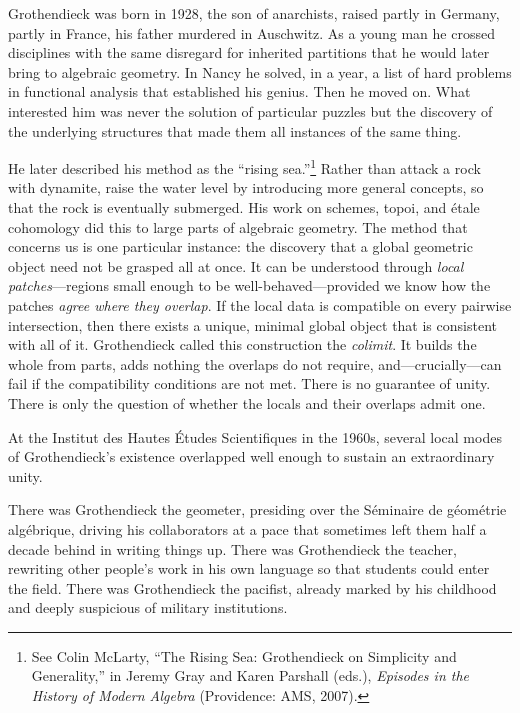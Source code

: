Grothendieck was born in 1928, the son of anarchists, raised partly in Germany, partly in France, his father murdered in Auschwitz. As a young man he crossed disciplines with the same disregard for inherited partitions that he would later bring to algebraic geometry. In Nancy he solved, in a year, a list of hard problems in functional analysis that established his genius. Then he moved on. What interested him was never the solution of particular puzzles but the discovery of the underlying structures that made them all instances of the same thing.

He later described his method as the ``rising sea.''\footnote{See Colin McLarty, ``The Rising Sea: Grothendieck on Simplicity and Generality,'' in Jeremy Gray and Karen Parshall (eds.), \emph{Episodes in the History of Modern Algebra} (Providence: AMS, 2007).} Rather than attack a rock with dynamite, raise the water level by introducing more general concepts, so that the rock is eventually submerged. His work on schemes, topoi, and \'{e}tale cohomology did this to large parts of algebraic geometry. The method that concerns us is one particular instance: the discovery that a global geometric object need not be grasped all at once. It can be understood through \emph{local patches}---regions small enough to be well-behaved---provided we know how the patches \emph{agree where they overlap}. If the local data is compatible on every pairwise intersection, then there exists a unique, minimal global object that is consistent with all of it. Grothendieck called this construction the \emph{colimit}. It builds the whole from parts, adds nothing the overlaps do not require, and---crucially---can fail if the compatibility conditions are not met. There is no guarantee of unity. There is only the question of whether the locals and their overlaps admit one.

At the Institut des Hautes \'{E}tudes Scientifiques in the 1960s, several local modes of Grothendieck's existence overlapped well enough to sustain an extraordinary unity.

There was Grothendieck the geometer, presiding over the S\'{e}minaire de g\'{e}om\'{e}trie alg\'{e}brique, driving his collaborators at a pace that sometimes left them half a decade behind in writing things up. There was Grothendieck the teacher, rewriting other people's work in his own language so that students could enter the field. There was Grothendieck the pacifist, already marked by his childhood and deeply suspicious of military institutions.

